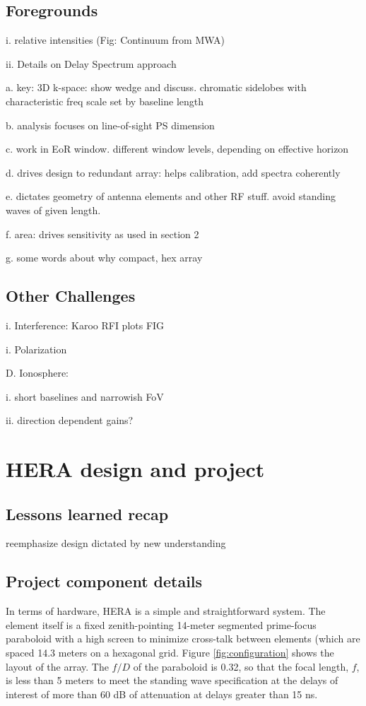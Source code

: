 \documentclass[preprint]{aastex}
\begin{document}
\subsection{Foregrounds}  %

i. relative intensities (Fig: Continuum from MWA)

ii. Details on Delay Spectrum approach

a. key: 3D k-space: show wedge and discuss. chromatic sidelobes with characteristic freq scale 
set by baseline length

b. analysis focuses on line-of-sight PS dimension

c. work in EoR window.  different window levels, depending on effective horizon

d. drives design to redundant array: helps calibration, add spectra coherently

e. dictates geometry of antenna elements and other RF stuff. avoid standing waves of given length. 

f. area: drives sensitivity as used in section 2

g. some words about why compact, hex array 

\subsection{Other Challenges} %

i. Interference: Karoo RFI plots  FIG 

i. Polarization 

D. Ionosphere: 

i. short baselines and narrowish FoV

ii. direction dependent gains?


\section{HERA design and project} %

\subsection{Lessons learned recap} %

reemphasize design dictated by new understanding

\subsection{Project component details}  %
In terms of hardware, HERA is a simple and straightforward system.  The element
itself is a fixed zenith-pointing 14-meter segmented prime-focus paraboloid with a high screen
to minimize cross-talk between elements (which are spaced 14.3 meters on a
hexagonal grid.  Figure \ref{fig:configuration} shows the layout of the array.  The $f/D$ of
the paraboloid is 0.32, so that the focal length, $f$, is less than 5 meters to meet the 
standing wave specification at the delays of interest of more than 60 dB of attenuation at delays 
greater than 15 ns.
\end{document}
